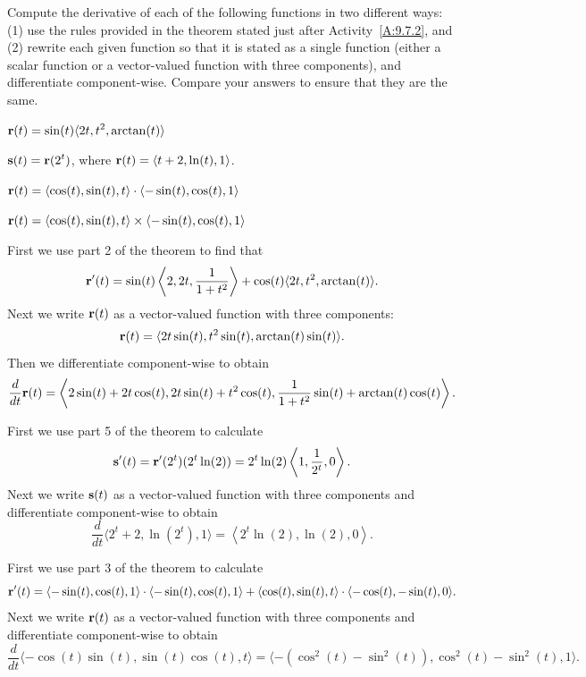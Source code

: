 \begin{exercises} 

\item \label{Ez:9.7.1}    Compute the derivative of each of the following functions in two different ways:  (1) use the rules provided in the theorem stated just after Activity~\ref{A:9.7.2}, and (2) rewrite each given function so that it is stated as a single function (either a scalar function or a vector-valued function with three components), and differentiate component-wise.  Compare your answers to ensure that they are the same.
    \ba
    \item $\displaystyle \mathbf{r}(t) = \sin(t) \langle 2t, t^2, \arctan(t) \rangle$

    \item $\displaystyle \mathbf{s}(t) = \mathbf{r}(2^t)$, where $\mathbf{r}(t) = \langle t+2, \ln(t), 1 \rangle$.
    
    \item $\displaystyle \mathbf{r}(t) = \langle \cos(t), \sin(t), t \rangle \cdot \langle -\sin(t), \cos(t), 1 \rangle$
    
    \item $\displaystyle \mathbf{r}(t) = \langle \cos(t), \sin(t), t \rangle \times \langle -\sin(t), \cos(t), 1 \rangle$
     
    \ea

\begin{exerciseSolution}
    \ba
    \item First we use part 2 of the theorem to find that 
\[\mathbf{r}'(t) = \sin(t) \left\langle 2, 2t, \frac{1}{1+t^2} \right\rangle + \cos(t) \langle 2t, t^2, \arctan(t) \rangle.\]
Next we write $\mathbf{r}(t)$ as a vector-valued function with three components:
\[\mathbf{r}(t) = \langle 2t \sin(t), t^2 \sin(t), \arctan(t) \sin(t) \rangle.\]
Then we differentiate component-wise to obtain
\[\frac{d}{dt} \mathbf{r}(t)  = \left\langle 2\sin(t) + 2t \cos(t), 2t \sin(t) + t^2 \cos(t), \frac{1}{1+t^2} \sin(t) + \arctan(t) \cos(t) \right\rangle.\]

    \item First we use part 5 of the theorem to calculate
\[\mathbf{s}'(t) = \mathbf{r}'(2^t)(2^t \ln(2)) = 2^t \ln(2) \left\langle 1, \frac{1}{2^t}, 0 \right\rangle.\]
Next we write $\mathbf{s}(t)$ as a vector-valued function with three components and differentiate component-wise to obtain
\[\frac{d}{dt} \langle 2^t+2, \ln(2^t), 1 \rangle = \left\langle 2^t \ln(2), \ln(2), 0 \right\rangle.\]
    
    \item First we use part 3 of the theorem to calculate
\[\mathbf{r}'(t) = \langle -\sin(t), \cos(t), 1 \rangle \cdot \langle -\sin(t), \cos(t), 1 \rangle + \langle \cos(t), \sin(t), t \rangle \cdot \langle -\cos(t), -\sin(t), 0 \rangle.\]
Next we write $\mathbf{r}(t)$ as a vector-valued function with three components and differentiate component-wise to obtain
\[\frac{d}{dt} \langle -\cos(t) \sin(t), \sin(t) \cos(t), t \rangle = \langle -(\cos^2(t)-\sin^2(t)), \cos^2(t)-\sin^2(t), 1 \rangle.\]
    

\end{exerciseSolution}
\end{exercises}
